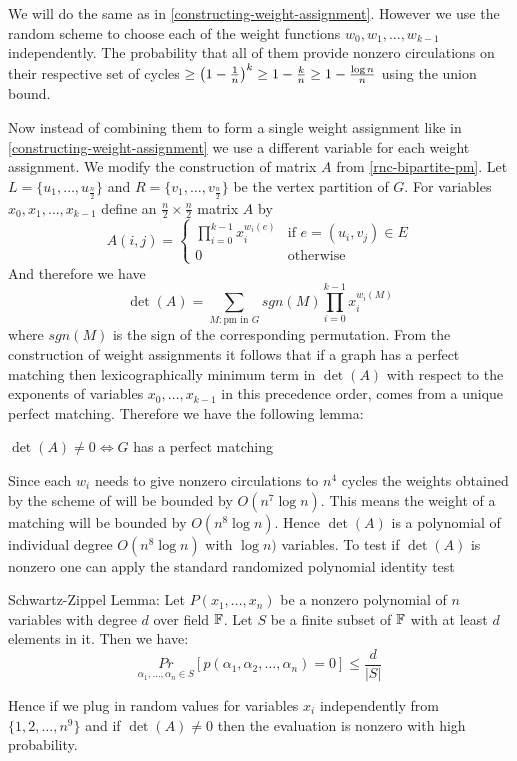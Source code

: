 We will do the same as in \autoref{constructing-weight-assignment}. However we use the random scheme  to choose each of the weight functions $w_0,w_1,\dots, w_{k-1}$ independently. The probability that all of them provide nonzero circulations on their respective set of cycles $\geq \left(1-\frac1n \right)^k\geq 1-\frac{k}{n}\geq 1-\frac{\log n}{n}$ using the union bound. 

Now instead of combining them to form a single weight assignment like in \autoref{constructing-weight-assignment} we use a different variable for each weight assignment. We modify the construction of matrix $A$ from \autoref{rnc-bipartite-pm}. Let $L=\{u_1,\dots, u_{\frac{n}2}\}$ and $R=\{v_1,\dots, v_{\frac{n}2}\}$ be the vertex partition of $G$. For variables $x_0,x_1,\dots, x_{k-1}$ define an $\frac{n}2\times \frac{n}2$ matrix $A$ by \[
	 A(i,j)=\begin{cases}
		\prod\limits_{i=0}^{k-1} x_i^{w_i(e)} & \text{if $e=(u_i,v_j)\in E$}\\ 
		0 & \text{otherwise}
	 \end{cases}
\]
And therefore we have $$\det(A)=\sum\limits_{M: \text{pm in $G$}}^{} sgn(M)\prod\limits_{i=0}^{k-1} x_i^{w_i(M)}  $$ where $sgn(M)$ is the sign of the corresponding permutation. From the construction of weight assignments it follows that if a graph has a perfect matching then lexicographically minimum term in $\det(A)$ with respect to the exponents of variables $x_0,\dots, x_{k-1}$ in this precedence order, comes from a unique perfect matching. Therefore we have the following lemma:
\begin{lemma}{}{}
	$\det(A)\neq 0\iff G$ has a perfect matching
\end{lemma}

Since each $w_i$ needs to give nonzero circulations to $n^4	$ cycles the weights obtained by the scheme of  will be bounded by $O(n^7\log n)$. This means the weight of a matching will be bounded by $O(n^8\log n)$. Hence $\det(A)$ is a polynomial of individual degree $O(n^8\log n)$ with $\log n)$ variables. To test if $\det(A)$ is nonzero one can apply the standard randomized polynomial identity test
\begin{Theorem}{Schwartz-Zippel Lemma: \cite{Schwartz_1980_FPA,Zippel_1979}}{}
Let $P(x_1,\dots, x_n)$ be a nonzero polynomial of $n$ variables with degree $d$ over field $\mathbb{F}$.  Let $S$ be a finite subset of $\mathbb{F}$  with at least $d$ elements in it. Then we have: \[
\underset{\alpha_1,\dots, \alpha_n\in S}{Pr}[{p(\alpha_1,\alpha_2,\dots,\alpha_n)=0}]\leq \frac{d}{|S|}
\]
\end{Theorem}
Hence if we plug in random values for variables $x_i$ independently from $\{1,2,\dots, n^9\}$ and if $\det(A)\neq 0$ then the evaluation is nonzero with high probability.\parinf\vspace{3mm}

